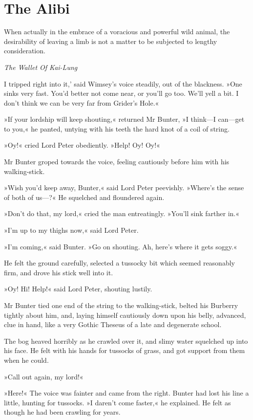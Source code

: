 
\chapter{The Alibi}

\epigraph{When actually in the embrace of a voracious and powerful wild animal, the desirability of leaving a limb is not a matter to be subjected to
lengthy consideration.}{\textit{The Wallet Of Kai-Lung}}

\lettrine[lines=4,ante=`]{I}{} tripped right into it,' said Wimsey's voice steadily, out of the blackness. »One sinks very fast. You'd better not come near, or you'll go too. We'll yell a bit. I don't think we can be very far from Grider's Hole.«

\zz
»If your lordship will keep shouting,« returned Mr Bunter, »I think—I can—get to you,« he panted, untying with his teeth the hard knot of a coil of string.

»Oy!« cried Lord Peter obediently. »Help! Oy! Oy!«

Mr Bunter groped towards the voice, feeling cautiously before him with his walking-stick.

»Wish you'd keep away, Bunter,« said Lord Peter peevishly. »Where's the sense of both of us—?« He squelched and floundered again.

»Don't do that, my lord,« cried the man entreatingly. »You'll sink farther in.«

»I'm up to my thighs now,« said Lord Peter.

»I'm coming,« said Bunter. »Go on shouting. Ah, here's where it gets soggy.«

He felt the ground carefully, selected a tussocky bit which seemed reasonably firm, and drove his stick well into it.

»Oy! Hi! Help!« said Lord Peter, shouting lustily.

Mr Bunter tied one end of the string to the walking-stick, belted his Burberry tightly about him, and, laying himself cautiously down upon his belly, advanced, clue in hand, like a very Gothic Theseus of a late and degenerate school.

The bog heaved horribly as he crawled over it, and slimy water squelched up into his face. He felt with his hands for tussocks of grass, and got support from them when he could.

»Call out again, my lord!«

»Here!« The voice was fainter and came from the right. Bunter had lost his line a little, hunting for tussocks. »I daren't come faster,« he explained. He felt as though he had been crawling for years.

